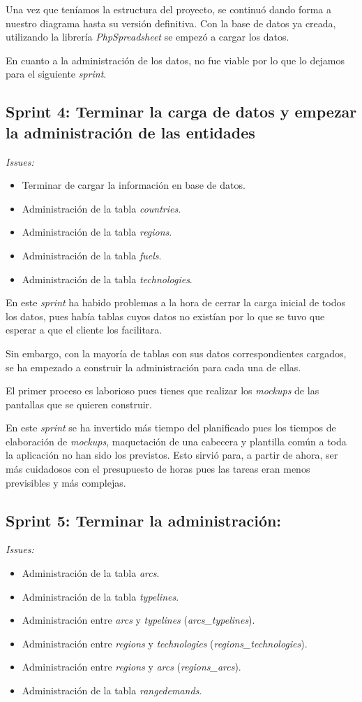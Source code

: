 Una vez que teníamos la estructura del proyecto, se continuó dando forma a nuestro diagrama hasta su versión definitiva. Con la base de datos ya creada, utilizando la librería \textit{PhpSpreadsheet} se empezó a cargar los datos.

En cuanto a la administración de los datos, no fue viable por lo que lo dejamos para el siguiente \textit{sprint}.

\subsection{Sprint 4: Terminar la carga de datos y empezar la administración de las entidades}
\textit{Issues:}
\begin{itemize}
	\item Terminar de cargar la información en base de datos.
	\item Administración de la tabla \textit{countries}.
	\item Administración de la tabla \textit{regions}.
	\item Administración de la tabla \textit{fuels}.
	\item Administración de la tabla \textit{technologies}.
\end{itemize}

En este \textit{sprint} ha habido problemas a la hora de cerrar la carga inicial de todos los datos, pues había tablas cuyos datos no existían por lo que se tuvo que esperar a que el cliente los facilitara.

Sin embargo, con la mayoría de tablas con sus datos correspondientes cargados, se ha empezado a construir la administración para cada una de ellas.

El primer proceso es laborioso pues tienes que realizar los \textit{mockups} de las pantallas que se quieren construir. 

En este \textit{sprint} se ha invertido más tiempo del planificado pues los tiempos de elaboración de \textit{mockups}, maquetación de una cabecera y plantilla común a toda la aplicación no han sido los previstos. Esto sirvió para, a partir de ahora, ser más cuidadosos con el presupuesto de horas pues las tareas eran menos previsibles y más complejas.

\subsection{Sprint 5: Terminar la administración:}
\textit{Issues:}
\begin{itemize}
	\item Administración de la tabla \textit{arcs}.
	\item Administración de la tabla \textit{typelines}.
	\item Administración entre \textit{arcs} y \textit{typelines} (\textit{arcs\_typelines}).
	\item Administración entre \textit{regions} y \textit{technologies} (\textit{regions\_technologies}).
	\item Administración entre \textit{regions} y \textit{arcs} (\textit{regions\_arcs}).
	\item Administración de la tabla \textit{rangedemands}.
\end{itemize}

